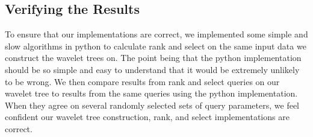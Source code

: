 \subsection{Verifying the Results}
To ensure that our implementations are correct, we implemented some simple and slow algorithms in python to calculate rank and select on the same input data we construct the wavelet trees on.
The point being that the python implementation should be so simple and easy to understand that it would be extremely unlikely to be wrong.
We then compare results from rank and select queries on our wavelet tree to results from the same queries using the python implementation.
When they agree on several randomly selected sets of query parameters, we feel confident our wavelet tree construction, rank, and select implementations are correct.
